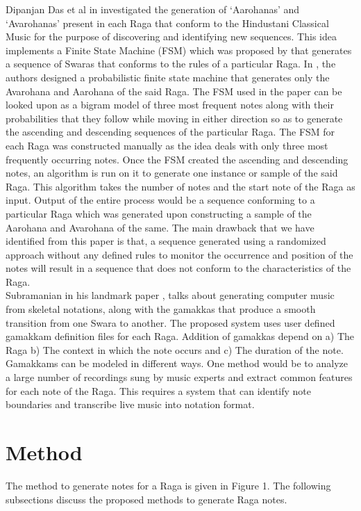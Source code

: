 \documentclass[journal]{IEEEtran}
\begin{document}
Dipanjan Das et al in \cite{das} investigated the generation of ‘Aarohanas’ and ‘Avarohanas’ present in each Raga that conform to the Hindustani Classical Music for the purpose of discovering and identifying new sequences. This idea implements a Finite State Machine (FSM) which was proposed by \cite{saha} that generates a sequence of Swaras that conforms to the rules of a particular Raga. In \cite{das}, the authors designed a probabilistic finite state machine that generates only the Avarohana and Aarohana of the said Raga. The FSM used in the paper can be looked upon as a bigram model of three most frequent notes along with their probabilities that they follow while moving in either direction so as to generate the ascending and descending sequences of the particular Raga. The FSM for each Raga was constructed manually as the idea deals with only three most frequently occurring notes. Once the FSM created the ascending and descending notes, an algorithm is run on it to generate one instance or sample of the said Raga. This algorithm takes the number of notes and the start note of the Raga as input. Output of the entire process would be a sequence conforming to a particular Raga which was generated upon constructing a sample of the Aarohana and Avarohana of the same. The main drawback that we have identified from this paper is that, a sequence generated using a randomized approach without any defined rules to monitor the occurrence and position of the notes will result in a sequence that does not conform to the characteristics of the Raga.\\

Subramanian in his landmark paper \cite{subra}, talks about generating computer music from skeletal notations, along with the gamakkas that produce a smooth transition from one Swara to another. The proposed system uses user defined gamakkam definition files for each Raga. Addition of gamakkas depend on a) The Raga b) The context in which the note occurs and c) The duration of the note. Gamakkams can be modeled in different ways. One method would be to analyze a large number of recordings sung by music experts and extract common features for each note of the Raga. This requires a system that can identify note boundaries and transcribe live music into notation format.

\section{Method}
The method to generate notes for a Raga is given in Figure 1. The following subsections discuss the proposed methods to generate Raga notes.
\end{document}
